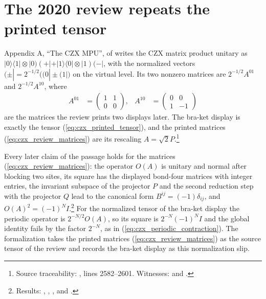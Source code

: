 \documentclass{article}
\begin{document}
\section{The 2020 review repeats the printed tensor}
Appendix A, ``The CZX MPU'', of \cite{Cirac2021Matrix} writes the CZX
matrix product unitary as
$\lvert 0\rangle\langle 1\rvert\otimes|0)(+| +
    \lvert 1\rangle\langle 0\rvert\otimes|1)(-|$, with the normalized
vectors $(\pm|=2^{-1/2}\bigl((0|\pm(1|\bigr)$ on the virtual level. Its two
nonzero matrices are $2^{-1/2}A^{01}$ and $2^{-1/2}A^{10}$, where
\begin{align}
    A^{01} & =\begin{pmatrix}1&1\\0&0\end{pmatrix}, &
    A^{10} & =\begin{pmatrix}0&0\\1&-1\end{pmatrix}
    \label{eq:czx_review_matrices}
\end{align}
are the matrices the review prints two displays later. The bra-ket display
is exactly the tensor (\ref{eq:czx_printed_tensor}), and the printed
matrices (\ref{eq:czx_review_matrices}) are its rescaling
$A=\sqrt{2}P$.\footnote{Source traceability:
    , lines 2582--2601.
    Witnesses:  and
    .}

Every later claim of the passage holds for the matrices
(\ref{eq:czx_review_matrices}): the operator $O(A)$ is unitary and normal
after blocking two sites, its square has the displayed bond-four matrices
with integer entries, the invariant subspace of the projector $P$ and the
second reduction step with the projector $Q$ lead to the
canonical form $B^{ij}=(-1)\delta_{ij}$, and
$O(A)^2=(-1)^NI$.\footnote{Results:
    ,
    ,
    ,
     and
    .}
For the normalized tensor of the bra-ket display the periodic operator is
$2^{-N/2}O(A)$, so its square is $2^{-N}(-1)^NI$ and the global identity
fails by the factor $2^{-N}$, as in (\ref{eq:czx_periodic_contraction}).
The formalization takes the printed matrices (\ref{eq:czx_review_matrices})
as the source tensor of the review and records the bra-ket display as this
normalization slip.
\end{document}
